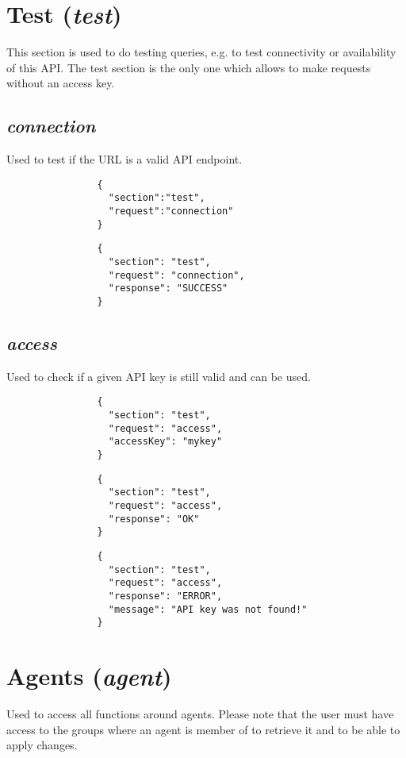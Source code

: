 \documentclass{article}
\begin{document}
	\section*{Test (\textit{test})}
		This section is used to do testing queries, e.g. to test connectivity or availability of this API. The test section is the only one which allows to make requests without an access key.
		\subsection*{\textit{connection}}
			Used to test if the URL is a valid API endpoint.
			{
				\color{blue}
				\begin{verbatim}
				{
				  "section":"test",
				  "request":"connection"
				}
				\end{verbatim}
		    }
			
			{
				\color{OliveGreen}
				\begin{verbatim}
				{
				  "section": "test",
				  "request": "connection",
				  "response": "SUCCESS"
				}
				\end{verbatim}
			}
		\subsection*{\textit{access}}
			Used to check if a given API key is still valid and can be used.
			{
				\color{blue}
				\begin{verbatim}
				{
				  "section": "test",
				  "request": "access",
				  "accessKey": "mykey"
				}
				\end{verbatim}
			}
			{
				\color{OliveGreen}
				\begin{verbatim}
				{
				  "section": "test",
				  "request": "access",
				  "response": "OK"
				}
				\end{verbatim}
			}
			{
				\color{BrickRed}
				\begin{verbatim}
				{
				  "section": "test",
				  "request": "access",
				  "response": "ERROR",
				  "message": "API key was not found!"
				}
				\end{verbatim}
			}
	\section*{Agents (\textit{agent})}
		Used to access all functions around agents. Please note that the user must have access to the groups where an agent is member of to retrieve it and to be able to apply changes.
\end{document}
